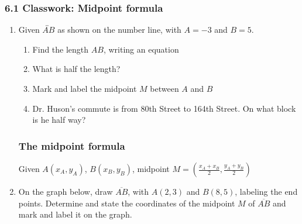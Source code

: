 

\fancyhead[LE]{\thepage}



\subsubsection*{6.1 Classwork: Midpoint formula}
\begin{enumerate}
\item Given $\overleftrightarrow{AB}$ as shown on the number line, with $A=-3$ and $B=5$. 
\begin{enumerate}
    \item Find the length $AB$, writing an equation
    \item What is half the length? 
    \item Mark and label the midpoint $M$ between $A$ and $B$\\[1cm]
    \item Dr. Huson's commute is from 80th Street to 164th Street. On what block is he half way?
\end{enumerate}
    \vspace{3cm}
    
    \subsubsection*{The midpoint formula}
    Given $A(x_A,y_A)$, $B(x_B,y_B)$, midpoint $\displaystyle M = \left(\frac{x_A+x_B}{2}, \frac{y_A+y_B}{2}\right)$
\item On the graph below, draw $\overline{AB}$, with $A(2,3)$ and $B(8,5)$, labeling the end points. Determine and state the coordinates of the midpoint $M$ of $\overline{AB}$ and mark and label it on the graph.
\begin{flushright}
\end{flushright}
    

\end{enumerate}
